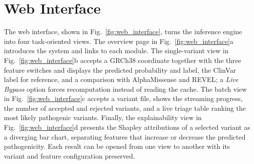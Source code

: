 \section{Web Interface}
\label{sec:web_interface}

The web interface, shown in Fig.~\ref{fig:web_interface}, turns the inference engine into four task-oriented views. The overview page in Fig.~\ref{fig:web_interface}a introduces the system and links to each module. The single-variant view in Fig.~\ref{fig:web_interface}b accepts a GRCh38 coordinate together with the three feature switches and displays the predicted probability and label, the ClinVar label for reference, and a comparison with AlphaMissense and REVEL; a \textit{Live Bypass} option forces recomputation instead of reading the cache. The batch view in Fig.~\ref{fig:web_interface}c accepts a variant file, shows the streaming progress, the number of accepted and rejected variants, and a live triage table ranking the most likely pathogenic variants. Finally, the explainability view in Fig.~\ref{fig:web_interface}d presents the Shapley attributions of a selected variant as a diverging bar chart, separating features that increase or decrease the predicted pathogenicity. Each result can be opened from one view to another with its variant and feature configuration preserved.

